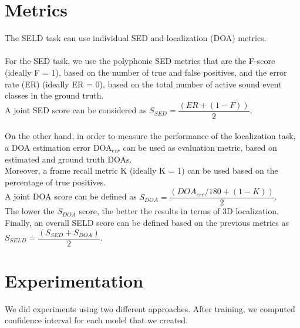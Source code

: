\documentclass{article}
\begin{document}
    \section{Metrics}
    The SELD task can use individual SED and localization (DOA) metrics.
    \\ \\ For the SED task, we use the polyphonic SED metrics that are the F-score (ideally F = 1), based on the number of true and false positives, and the error rate (ER) (ideally ER = 0), based on the total number of active sound event classes in the ground truth.\\
    A joint SED score can be considered as $S_{SED} = \dfrac{(ER+(1-F))}{2}$.
    \\ \\ On the other hand, in order to measure the performance of the localization task, a DOA estimation error DOA$_{err}$ can be used as evaluation metric, based on estimated and ground truth DOAs.\\ Moreover, a frame recall metric K (ideally K = 1) can be used based on the percentage of true positives. \\
    A joint DOA score can be defined as $S_{DOA} = \dfrac{(DOA_{err}/180 + (1 - K))}{2}$.\\
    The lower the $S_{DOA}$ score, the better the results in terms of 3D localization.
    Finally, an overall SELD score can be defined based on the previous metrics as $S_{SELD} = \dfrac{(S_{SED} + S_{DOA})}{2}$.
    \section{Experimentation}
    We did experiments using two different approaches. After training, we computed confidence interval for each model that we created.
\end{document}
